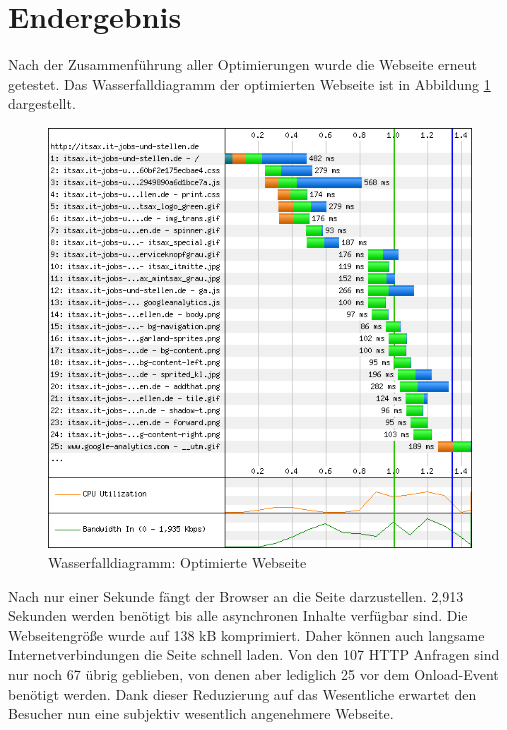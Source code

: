 \section{Endergebnis} 
Nach der Zusammenführung aller Optimierungen wurde die Webseite erneut getestet. Das Wasserfalldiagramm der optimierten Webseite ist in Abbildung \ref{fig:endwaterfall} dargestellt. 
\begin{figure}[!ht]
  \centering
  \includegraphics[scale=0.5]{material/end_waterfall.png}
  \caption{Wasserfalldiagramm: Optimierte Webseite}
  \label{fig:endwaterfall}
\end{figure}
Nach nur einer Sekunde fängt der Browser an die Seite darzustellen. 2,913 Sekunden werden benötigt bis alle asynchronen Inhalte verfügbar sind. Die Webseitengröße wurde auf 138 kB komprimiert. Daher können auch langsame Internetverbindungen die Seite schnell laden. Von den 107 HTTP Anfragen sind nur noch 67 übrig geblieben, von denen aber lediglich 25 vor dem Onload-Event ben\"otigt werden. Dank dieser Reduzierung auf das Wesentliche erwartet den Besucher nun eine subjektiv wesentlich angenehmere Webseite.
